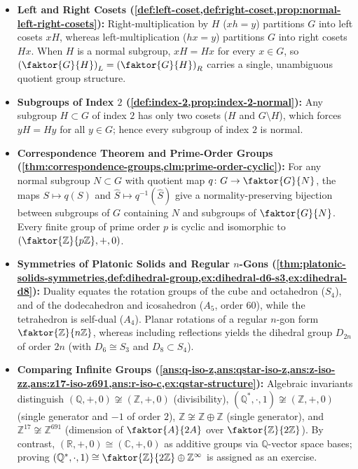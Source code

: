 \begin{overview}
\begin{itemize}
    \item \textbf{Left and Right Cosets (\cref{def:left-coset,def:right-coset,prop:normal-left-right-cosets}):} Right-multiplication by $H$ ($xh = y$) partitions $G$ into left cosets $xH$, whereas left-multiplication ($hx = y$) partitions $G$ into right cosets $Hx$. When $H$ is a normal subgroup, $xH = Hx$ for every $x \in G$, so $\left(\faktor{G}{H}\right)_L = \left(\faktor{G}{H}\right)_R$ carries a single, unambiguous quotient group structure.
    \item \textbf{Subgroups of Index $2$ (\cref{def:index-2,prop:index-2-normal}):} Any subgroup $H \subset G$ of index $2$ has only two cosets ($H$ and $G \setminus H$), which forces $yH = Hy$ for all $y \in G$; hence every subgroup of index $2$ is normal.
    \item \textbf{Correspondence Theorem and Prime-Order Groups (\cref{thm:correspondence-groups,clm:prime-order-cyclic}):} For any normal subgroup $N \subset G$ with quotient map $q \colon G \to \faktor{G}{N}$, the maps $S \mapsto q(S)$ and $\hat{S} \mapsto q^{-1}(\hat{S})$ give a normality-preserving bijection between subgroups of $G$ containing $N$ and subgroups of $\faktor{G}{N}$. Every finite group of prime order $p$ is cyclic and isomorphic to $\left(\faktor{\mathbb{Z}}{p\mathbb{Z}}, +, 0\right)$.
    \item \textbf{Symmetries of Platonic Solids and Regular $n$-Gons (\cref{thm:platonic-solids-symmetries,def:dihedral-group,ex:dihedral-d6-s3,ex:dihedral-d8}):} Duality equates the rotation groups of the cube and octahedron ($S_4$), and of the dodecahedron and icosahedron ($A_5$, order $60$), while the tetrahedron is self-dual ($A_4$). Planar rotations of a regular $n$-gon form $\faktor{\mathbb{Z}}{n\mathbb{Z}}$, whereas including reflections yields the dihedral group $D_{2n}$ of order $2n$ (with $D_6 \cong S_3$ and $D_8 \subset S_4$).
    \item \textbf{Comparing Infinite Groups (\cref{ans:q-iso-z,ans:qstar-iso-z,ans:z-iso-zz,ans:z17-iso-z691,ans:r-iso-c,ex:qstar-structure}):} Algebraic invariants distinguish $(\mathbb{Q},+,0) \not\cong (\mathbb{Z},+,0)$ (divisibility), $(\mathbb{Q}^*,\cdot,1) \not\cong (\mathbb{Z},+,0)$ (single generator and $-1$ of order $2$), $\mathbb{Z} \not\cong \mathbb{Z} \oplus \mathbb{Z}$ (single generator), and $\mathbb{Z}^{17} \not\cong \mathbb{Z}^{691}$ (dimension of $\faktor{A}{2A}$ over $\faktor{\mathbb{Z}}{2\mathbb{Z}}$). By contrast, $(\mathbb{R},+,0) \cong (\mathbb{C},+,0)$ as additive groups via $\mathbb{Q}$-vector space bases; proving $(\mathbb{Q}^*,\cdot,1) \cong \faktor{\mathbb{Z}}{2\mathbb{Z}} \oplus \mathbb{Z}^\infty$ is assigned as an exercise.

\end{itemize}
\end{overview}
